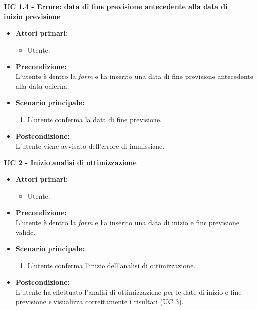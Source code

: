 \vspace{0.4cm}

\noindent \textbf{\large UC 1.4 - Errore: data di fine previsione antecedente alla data di \\\hspace*{56pt}inizio previsione}
\label{uc:err-inserimento-data-fine-prev}
\begin{itemize}

	\item \textbf{Attori primari: }
		\begin{itemize}
			\item Utente.
		\end{itemize}

	\item \textbf{Precondizione: }\\[0.3cm]
		L'utente è dentro la \textit{form} e ha inserito una data di fine previsione antecedente
		alla data odierna.

	\item \textbf{Scenario principale: }
		\begin{enumerate}
			\item L'utente conferma la data di fine previsione.
		\end{enumerate}
		

	\item \textbf{Postcondizione: }\\[0.3cm]
		L'utente viene avvisato dell'errore di immissione.

\end{itemize}

\vspace{0.4cm}
\newpage

\noindent \textbf{\large UC 2 - Inizio analisi di ottimizzazione}
\label{uc:inizio-analisi-ottimizzazione}
\begin{itemize}

	\item \textbf{Attori primari: }
		\begin{itemize}
			\item Utente.
		\end{itemize}

	\item \textbf{Precondizione: }\\[0.3cm]
		L'utente è dentro la \textit{form} e ha inserito una data di inizio e fine previsione valide.

	\item \textbf{Scenario principale: }
		\begin{enumerate}
			\item L'utente conferma l'inizio dell'analisi di ottimizzazione.
		\end{enumerate}
		

	\item \textbf{Postcondizione: }\\[0.3cm]
		L'utente ha effettuato l'analisi di ottimizzazione per le date di inizio e fine previsione e visualizza correttamente i
		risultati (\hyperref[uc:visualizzazione-risultati]{UC 3}).

\end{itemize}

